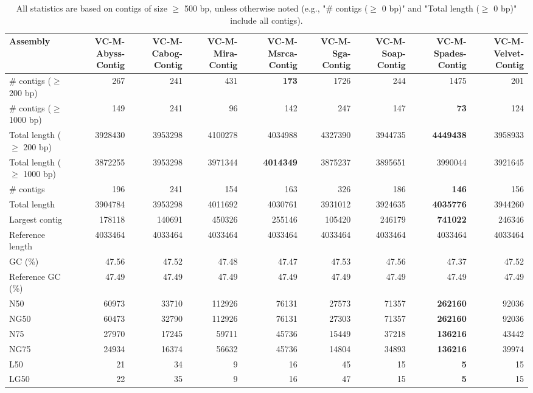 \documentclass[12pt,a4paper]{article}
\begin{document}
\begin{table}[ht]
\begin{center}
\caption{All statistics are based on contigs of size $\geq$ 500 bp, unless otherwise noted (e.g., "\# contigs ($\geq$ 0 bp)" and "Total length ($\geq$ 0 bp)" include all contigs).}
\begin{tabular}{|l*{8}{|r}|}
\hline
Assembly & VC-M-Abyss-Contig & VC-M-Cabog-Contig & VC-M-Mira-Contig & VC-M-Msrca-Contig & VC-M-Sga-Contig & VC-M-Soap-Contig & VC-M-Spades-Contig & VC-M-Velvet-Contig \\ \hline
\# contigs ($\geq$ 200 bp) & 267 & 241 & 431 & {\bf 173} & 1726 & 244 & 1475 & 201 \\ \hline
\# contigs ($\geq$ 1000 bp) & 149 & 241 & 96 & 142 & 247 & 147 & {\bf 73} & 124 \\ \hline
Total length ($\geq$ 200 bp) & 3928430 & 3953298 & 4100278 & 4034988 & 4327390 & 3944735 & {\bf 4449438} & 3958933 \\ \hline
Total length ($\geq$ 1000 bp) & 3872255 & 3953298 & 3971344 & {\bf 4014349} & 3875237 & 3895651 & 3990044 & 3921645 \\ \hline
\# contigs & 196 & 241 & 154 & 163 & 326 & 186 & {\bf 146} & 156 \\ \hline
Total length & 3904784 & 3953298 & 4011692 & 4030761 & 3931012 & 3924635 & {\bf 4035776} & 3944260 \\ \hline
Largest contig & 178118 & 140691 & 450326 & 255146 & 105420 & 246179 & {\bf 741022} & 246346 \\ \hline
Reference length & 4033464 & 4033464 & 4033464 & 4033464 & 4033464 & 4033464 & 4033464 & 4033464 \\ \hline
GC (\%) & 47.56 & 47.52 & 47.48 & 47.47 & 47.53 & 47.56 & 47.37 & 47.52 \\ \hline
Reference GC (\%) & 47.49 & 47.49 & 47.49 & 47.49 & 47.49 & 47.49 & 47.49 & 47.49 \\ \hline
N50 & 60973 & 33710 & 112926 & 76131 & 27573 & 71357 & {\bf 262160} & 92036 \\ \hline
NG50 & 60473 & 32790 & 112926 & 76131 & 27303 & 71357 & {\bf 262160} & 92036 \\ \hline
N75 & 27970 & 17245 & 59711 & 45736 & 15449 & 37218 & {\bf 136216} & 43442 \\ \hline
NG75 & 24934 & 16374 & 56632 & 45736 & 14804 & 34893 & {\bf 136216} & 39974 \\ \hline
L50 & 21 & 34 & 9 & 16 & 45 & 15 & {\bf 5} & 15 \\ \hline
LG50 & 22 & 35 & 9 & 16 & 47 & 15 & {\bf 5} & 15 \\ \hline

\end{tabular}
\end{center}
\end{table}
\end{document}
